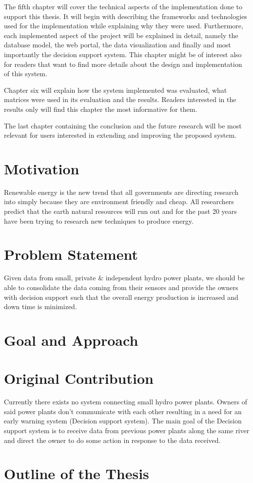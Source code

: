 \indent The fifth chapter will cover the technical aspects of the implementation done to support this thesis. It will begin with describing the frameworks and technologies used for the implementation while explaining why they were used. Furthermore, each implemented aspect of the project will be explained in detail, namely the database model, the web portal, the data visualization and finally and most importantly the decision support system. This chapter might be of interest also for readers that want to find more details about the design and implementation of this system.

\indent Chapter six will explain how the system implemented was evaluated, what matrices were used in its evaluation and the results. Readers interested in the results only will find this chapter the most informative for them.

\indent The last chapter containing the conclusion and the future research will be most relevant for users interested in extending and improving the proposed system.
\section{Motivation}          
\label{sec:Motivation}
\indent Renewable energy is the new trend that all governments are directing research into simply because they are environment friendly and cheap. All researchers predict that the earth natural resources will run out and for the past 20 years have been trying to research new techniques to produce energy.\cite{SEIT2017} \\
\section{Problem Statement}
\label{sec:Problem Statement}
\indent Given data from small, private \& independent hydro power plants, we should be able to consolidate the data coming from their sensors and provide the owners with decision support such that the overall energy production is increased and down time is minimized. \\
\section{Goal and Approach}
\label{sec:GoalAndApproach}
\section{Original Contribution}
\label{sec:OriginalContribution}
\indent Currently there exists no system connecting small hydro power plants. Owners of said power plants don't communicate with each other resulting in a need for an early warning system (Decision support system). The main goal of the Decision support system is to receive data from previous power plants along the same river and direct the owner to do some action in response to the data received.\\
\section{Outline of the Thesis}
\label{sec:OutlineOfTheThesis}